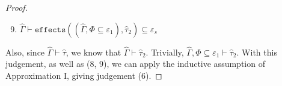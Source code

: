 \documentclass{llncs}
\newcommand{\keywadj}[1]{\mathtt{#1}}
\newcommand{\kwa}[1]{\keywadj{ #1 }}
\newcommand{\fx}[1]{ \kwa{effects}(#1) }
\begin{document}
\begin{proof}
\begin{enumerate}
	\setcounter{enumi}{8}
	\item $\hat \Gamma \vdash \fx{(\hat \Gamma, \Phi \subseteq \varepsilon_1), \hat \tau_2} \subseteq \varepsilon_s$
\end{enumerate}

\noindent
Also, since $\hat \Gamma \vdash \hat \tau$, we know that $\hat \Gamma \vdash \hat \tau_2$. Trivially, $\hat \Gamma, \Phi \subseteq \varepsilon_1 \vdash \hat \tau_2$. With this judgement, as well as (8, 9), we can apply the inductive assumption of Approximation I, giving judgement (6).

\end{proof}
\end{document}
